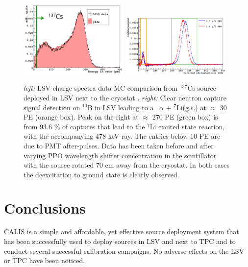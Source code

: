 \begin{figure}[htbp]
\centering
\includegraphics[width=0.48\textwidth]{./Figures/137Cs_Veto_Paolo_G4DS_UCLA.png}
\includegraphics[width=0.48\textwidth]{./Figures/AmBe_LSV_VetoPaper.png}
\caption{\textit{left:} LSV charge spectra data-MC comparison from $^{137}$Cs source deployed in LSV next to the cryostat \cite{DS50:G4DS:paper}.
\textit{right:} Clear neutron capture signal detection on $^{10}$B in LSV leading to a \enbortengroundalpha\ $\alpha$ + $^7$Li(g.s.) at $\approx$ 30 PE (orange box). Peak on the right at $\approx$ 270 PE (green box) is from 93.6 \% of captures that lead to the $^7$Li excited state reaction, with the accompanying 478 keV-ray. The entries below 10 PE are due to PMT after-pulses. Data has been taken before and after varying PPO wavelength shifter concentration in the scintillator with the source rotated 70 cm away from the cryostat. In both cases the deexcitation to ground state is clearly observed.\cite{Agnes:2015qyz}
\label{fig:LSV:Calib}} 
\end{figure}



\section{Conclusions}\label{sec:Conclusions}\label{sec:Conclusion}
CALIS is a simple and affordable, yet effective source deployment system that has been successfully used to deploy sources in LSV and next to TPC and to conduct several successful calibration campaigns. No adverse effects on the LSV or TPC have been noticed.

